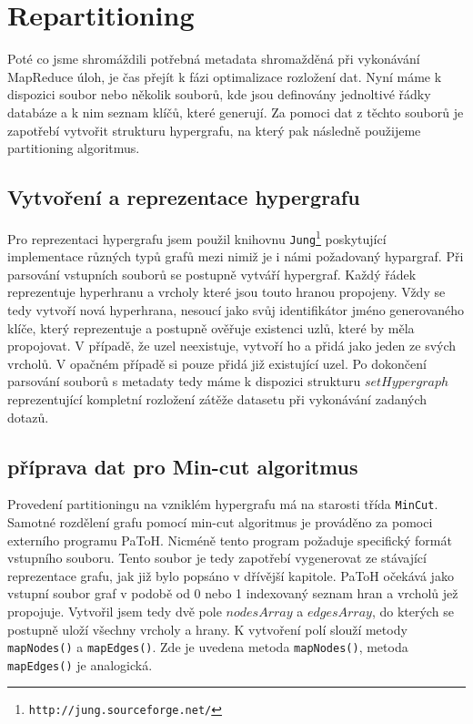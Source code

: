\documentclass[thesis=M,czech]{FITthesis}[2012/06/26]
\begin{document}
\section{Repartitioning}
Poté co jsme shromáždili potřebná metadata shromažděná při vykonávání MapReduce úloh, je čas přejít k fázi optimalizace rozložení dat. Nyní máme k dispozici soubor nebo několik souborů, kde jsou definovány jednoltivé řádky databáze a k nim seznam klíčů, které generují. Za pomoci dat z těchto souborů je zapotřebí vytvořit strukturu hypergrafu, na který pak následně použijeme partitioning algoritmus.

\subsection{Vytvoření a reprezentace hypergrafu}
Pro reprezentaci hypergrafu jsem použil knihovnu \texttt{Jung}\footnote{\texttt{http://jung.sourceforge.net/}} poskytující implementace různých typů grafů mezi nimiž je i námi požadovaný hypargraf. Při parsování vstupních souborů se postupně vytváří hypergraf.  Každý řádek reprezentuje hyperhranu a vrcholy které jsou touto hranou propojeny. Vždy se tedy vytvoří nová hyperhrana, nesoucí jako svůj identifikátor jméno generovaného klíče, který reprezentuje a postupně ověřuje existenci uzlů, které by měla propojovat. V případě, že uzel neexistuje, vytvoří ho a přidá jako jeden ze svých vrcholů. V opačném případě si pouze přidá již existující uzel. Po dokončení parsování souborů s metadaty tedy máme k dispozici strukturu $setHypergraph$ reprezentující kompletní rozložení zátěže datasetu při vykonávání zadaných dotazů.

\subsection{příprava dat pro Min-cut algoritmus}
Provedení partitioningu na vzniklém hypergrafu má na starosti třída \texttt{MinCut}. Samotné rozdělení grafu pomocí min-cut algoritmus je prováděno za pomoci externího programu PaToH. Nicméně tento program požaduje specifický formát vstupního souboru. Tento soubor je tedy zapotřebí vygenerovat ze stávající reprezentace grafu, jak již bylo popsáno v dřívější kapitole. PaToH očekává jako vstupní soubor graf v podobě od 0 nebo 1 indexovaný seznam hran a vrcholů jež propojuje.  Vytvořil jsem tedy dvě pole $nodesArray$ a $edgesArray$, do kterých se postupně uloží všechny vrcholy a hrany. K vytvoření polí slouží metody \texttt{mapNodes()} a \texttt{mapEdges()}. Zde je uvedena metoda \texttt{mapNodes()}, metoda \texttt{mapEdges()} je analogická.
\end{document}
